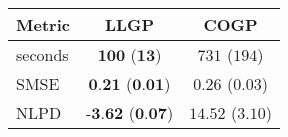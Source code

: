 \begin{tabular}{|l|cc|}\hline\abovespace\belowspace
Metric & LLGP & COGP\\
\hline\abovespace
seconds & $\textbf{100}$ ($\textbf{13}$) & $731$ ($194$)\\
SMSE & $\textbf{0.21}$ ($\textbf{0.01}$) & $0.26$ ($0.03$)\\
NLPD & $\textbf{-3.62}$ ($\textbf{0.07}$) & $14.52$ ($3.10$)
\belowspace \\
\hline
\end{tabular}
